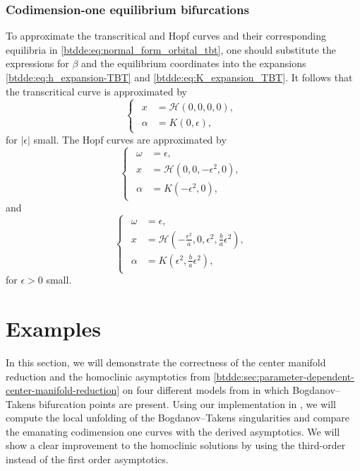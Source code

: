 \subsubsection{Codimension-one equilibrium bifurcations}
To approximate the transcritical and Hopf curves and their corresponding equilibria in
\cref{btdde:eq:normal_form_orbital_tbt}, one should substitute the expressions for $\beta$
and the equilibrium coordinates into the expansions \cref{btdde:eq:h_expansion-TBT} and
\cref{btdde:eq:K_expansion_TBT}. It follows that the transcritical curve is approximated by 
\begin{equation*}
\begin{cases}
\begin{aligned}
    x &= \mathcal H\left(0,0,0,0\right), \\
    \alpha &= K(0,\epsilon),
\end{aligned}
\end{cases}
\end{equation*}
for $|\epsilon|$ small. The Hopf curves are approximated by
\begin{equation*}
\begin{cases}
\begin{aligned}
    \omega &= \epsilon, \\
    x &= \mathcal H\left(0,0,-\epsilon^2,0\right), \\
    \alpha &= K\left(-\epsilon^2,0\right),
\end{aligned}
\end{cases}
\end{equation*}
and
\begin{equation*}
\begin{cases}
\begin{aligned}
    \omega &= \epsilon, \\
    x &= \mathcal H\left(-\frac{\epsilon^2}{a},0,\epsilon^2,\frac ba\epsilon^2\right), \\
    \alpha &= K\left(\epsilon^2,\frac ba\epsilon^2\right),
\end{aligned}
\end{cases}
\end{equation*}
for $\epsilon > 0$ small.

\section{Examples}
\label{btdde:sec:Examples}

In this section, we will demonstrate the correctness of the center manifold
reduction and the homoclinic asymptotics from
\cref{btdde:sec:parameter-dependent-center-manifold-reduction} on four different
models from
\cite{Jiao2021,giannakopoulos2001bifurcations,jiang2007bogdanov,dong2013bogdanov}
in which Bogdanov--Takens bifurcation points are present. Using our
implementation in \DDEBIFTOOL, we will compute the local unfolding of the
Bogdanov--Takens singularities and compare the emanating codimension one curves
with the derived asymptotics.  We will show a clear improvement to the
homoclinic solutions by using the third-order instead of the first order asymptotics. 

